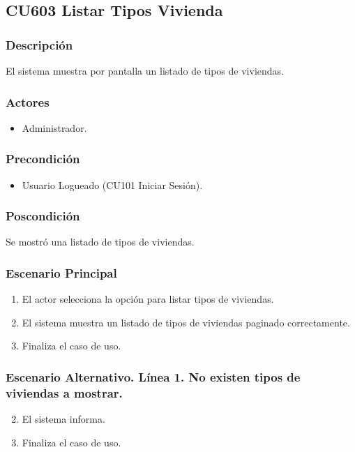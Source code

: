 \subsection{CU603 Listar Tipos Vivienda}
\subsubsection{Descripci\'{o}n}
El sistema muestra por pantalla un listado de tipos de viviendas.
\subsubsection{Actores}
\begin{itemize}
\item Administrador.
\end{itemize}
\subsubsection{Precondici\'{o}n}
\begin{itemize}
\item Usuario Logueado (CU101 Iniciar Sesi\'{o}n).
\end{itemize}
\subsubsection{Poscondici\'{o}n}
Se mostr\'{o} una listado de tipos de viviendas.
\subsubsection{Escenario Principal}
\begin{enumerate}
\item El actor selecciona la opci\'{o}n para listar tipos de viviendas.
\item El sistema muestra un listado de tipos de viviendas paginado correctamente.
\item Finaliza el caso de uso.
\end{enumerate}
\subsubsection{Escenario Alternativo. L\'{i}nea 1. No existen tipos de viviendas a mostrar.}
\begin{enumerate}
\setcounter{enumi}{1}
\item El sistema informa.
\item Finaliza el caso de uso.
\end{enumerate}